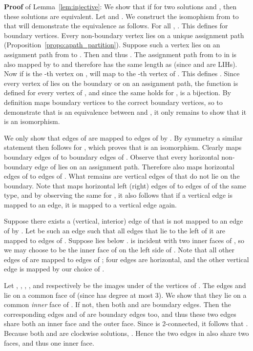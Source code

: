 \documentclass{llncs}
\begin{document}
\medskip

{\bf Proof} of Lemma~\ref{lem:injective}:
We show that if  for two solutions  and , then these solutions are equivalent.
Let  and .
We construct the isomophism  from  to  that will demonstrate the equivalence as follows. For all , . This defines  for boundary vertices. Every non-boundary vertex lies on a unique assignment path (Proposition~\ref{propo:apath_partition}). Suppose such a vertex  lies on an assignment path  from  to . Then  and thus . The assignment path  from  to  in  is also mapped by  to  and therefore has the same length as  (since  and  are LIHs). Now if  is the -th vertex on ,  will map  to the -th vertex of . This defines . Since every vertex of  lies on the boundary or on an assignment path, the function  is defined for every vertex of , and since the same holds for ,  is a bijection. By definition  maps boundary vertices to the correct boundary vertices, so to demonstrate that  is an equivalence between  and , it only remains to show that it is an isomorphism.


We only show that edges of  are mapped to edges of  by . By symmetry a similar statement then follows for , which proves that  is an isomorphism. Clearly  maps boundary edges of  to boundary edges of . Observe that every horizontal non-boundary edge of  
lies on an assignment path. Therefore  also maps horizontal edges of  to edges of . What remains are vertical edges of  that do not lie on the boundary. Note that  maps horizontal left (right) edges of  to edges of  of the same type, and by observing the same for , it also follows that if a vertical edge is mapped to an edge, it is mapped to a vertical edge again.


Suppose there exists a (vertical, interior) edge of  that is not mapped to an edge of  by . Let  be such an edge such that all edges that lie to the left of it
are mapped to edges of . Suppose  lies below .
 is incident with two inner faces of , so we may choose  to be the inner face of  on the left side of . Note that all other edges of  are mapped to edges of ; four edges are horizontal, and the other vertical edge is mapped by our choice of .

Let , , , ,  and  respectively be the images under  of the vertices of . 
The edges  and  lie on a common face of  (since  has degree at most 3). We show that they lie on a common {\em inner} face of . If not, then both  and  are boundary edges. Then the corresponding edges  and  of  are boundary edges too, and thus these two edges share both an inner face and the outer face. Since  is 2-connected, it follows that . Because both  and  are clockwise solutions, . Hence the two edges in  also share two faces, and thus one inner face. 
\end{document}
